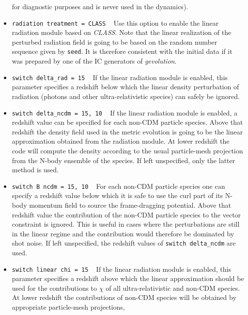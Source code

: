 \documentclass[a4paper,10pt]{article}
\begin{document}
\begin{itemize}
 for diagnostic purposes and is never used in the dynamics).
 \item[] \hspace{-25pt}\texttt{radiation treatment = CLASS} ~ Use this option to enable the linear radiation module based on \textit{CLASS}.
 Note that the linear realization of the perturbed radiation field is going to be based on the random number sequence given
 by \texttt{seed}. It is therefore consistent with the initial data if it was prepared by one of the IC generators of \textit{gevolution}.
 \item[] \hspace{-25pt}\texttt{switch delta\_rad = 15} ~ If the linear radiation module is enabled, this parameter specifies a
 redshift below which the linear density perturbation of radiation (photons and other ultra-relativistic species) can safely be ignored.
 \item[] \hspace{-25pt}\texttt{switch delta\_ncdm = 15, 10} ~ If the linear radiation module is enabled, a redshift value can be specified
 for each non-CDM particle species. Above that redshift the density field used in the metric evolution is going to be the linear
 approximation obtained from the radiation module. At lower redshift the code will compute the density according to the usual
 particle-mesh projection from the N-body ensemble of the species. If left unspecified, only the latter method is used.
 \item[] \hspace{-25pt}\texttt{switch B ncdm = 15, 10} ~ For each non-CDM particle species one can specify a redshift value below which
 it is safe to use the curl part of its N-body momentum field to source the frame-dragging potential. Above that redshift value
 the contribution of the non-CDM particle species to the vector constraint is ignored. This is useful in cases where the perturbations
 are still in the linear regime and the contribution would therefore be dominated by shot noise. If left unspecified, the redshift values
 of \texttt{switch delta\_ncdm} are used.
 \item[] \hspace{-25pt}\texttt{switch linear chi = 15} ~ If the linear radiation module is enabled, this parameter specifies a
 redshift above which the linear approximation should be used for the contributions to $\mathsf{\chi}$ of all ultra-relativistic
 and non-CDM species. At lower redshift the contributions of non-CDM species will be obtained by appropriate particle-mesh projections,

\end{itemize}
\end{document}
